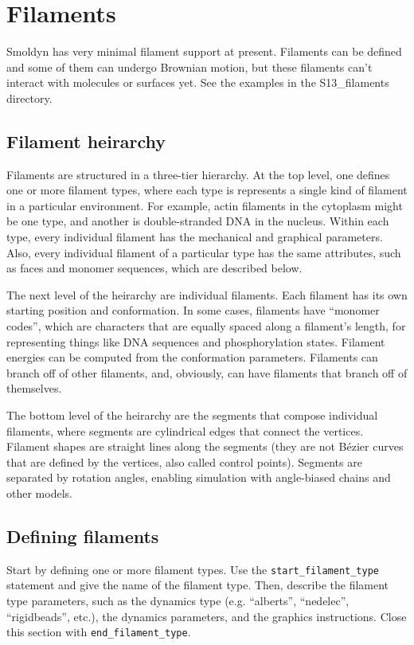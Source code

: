 \documentclass {scrbook}
\newcommand {\ttt} {\texttt}
\begin{document}
\chapter{Filaments}

Smoldyn has very minimal filament support at present. Filaments can be defined and some of them can undergo Brownian motion, but these filaments can't interact with molecules or surfaces yet. See the examples in the S13\_filaments directory.

\section{Filament heirarchy}

Filaments are structured in a three-tier hierarchy. At the top level, one defines one or more filament types, where each type is represents a single kind of filament in a particular environment. For example, actin filaments in the cytoplasm might be one type, and another is double-stranded DNA in the nucleus. Within each type, every individual filament has the mechanical and graphical parameters. Also, every individual filament of a particular type has the same attributes, such as faces and monomer sequences, which are described below.

The next level of the heirarchy are individual filaments. Each filament has its own starting position and conformation. In some cases, filaments have ``monomer codes'', which are characters that are equally spaced along a filament's length, for representing things like DNA sequences and phosphorylation states. Filament energies can be computed from the conformation parameters. Filaments can branch off of other filaments, and, obviously, can have filaments that branch off of themselves.

The bottom level of the heirarchy are the segments that compose individual filaments, where segments are cylindrical edges that connect the vertices. Filament shapes are straight lines along the segments (they are not B\'{e}zier curves that are defined by the vertices, also called control points). Segments are separated by rotation angles, enabling simulation with angle-biased chains and other models.

\section{Defining filaments}

Start by defining one or more filament types. Use the \ttt{start\_filament\_type} statement and give the name of the filament type. Then, describe the filament type parameters, such as the dynamics type (e.g. ``alberts'', ``nedelec'', ``rigidbeads'', etc.), the dynamics parameters, and the graphics instructions. Close this section with \ttt{end\_filament\_type}.
\end{document}
